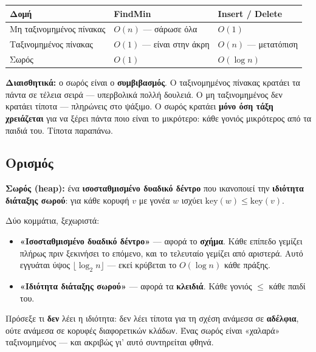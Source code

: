 \documentclass[11pt,a4paper]{article}
\begin{document}
\begin{center}
\begin{tabular}{@{}l l l@{}}
\toprule
Δομή & FindMin & Insert / Delete \\
\midrule
Μη ταξινομημένος πίνακας & $O(n)$ --- σάρωσε όλα      & $O(1)$ \\
Ταξινομημένος πίνακας    & $O(1)$ --- είναι στην άκρη & $O(n)$ --- μετατόπιση \\
Σωρός                    & $O(1)$                     & $O(\log n)$ \\
\bottomrule
\end{tabular}
\end{center}

\begin{intuition}
\textbf{Διαισθητικά:} ο σωρός είναι ο \textbf{συμβιβασμός}. Ο ταξινομημένος
πίνακας κρατάει τα πάντα σε τέλεια σειρά --- υπερβολικά πολλή δουλειά. Ο μη
ταξινομημένος δεν κρατάει τίποτα --- πληρώνεις στο ψάξιμο. Ο σωρός κρατάει
\textbf{μόνο όση τάξη χρειάζεται} για να ξέρει πάντα ποιο είναι το μικρότερο:
κάθε γονιός μικρότερος από τα παιδιά του. Τίποτα παραπάνω.
\end{intuition}

\subsection{Ορισμός}

\begin{keypoint}
\textbf{Σωρός (heap):} ένα \textbf{ισοσταθμισμένο δυαδικό δέντρο} που ικανοποιεί
την \textbf{ιδιότητα διάταξης σωρού}: για κάθε κορυφή $v$ με γονέα $w$ ισχύει
$\text{key}(w) \le \text{key}(v)$.
\end{keypoint}

Δύο κομμάτια, ξεχωριστά:
\begin{itemize}
  \item \textbf{«Ισοσταθμισμένο δυαδικό δέντρο»} --- αφορά το \textbf{σχήμα}.
  Κάθε επίπεδο γεμίζει πλήρως πριν ξεκινήσει το επόμενο, και το τελευταίο
  γεμίζει από αριστερά. Αυτό εγγυάται ύψος $\lfloor \log_2 n \rfloor$ --- εκεί
  κρύβεται το $O(\log n)$ κάθε πράξης.
  \item \textbf{«Ιδιότητα διάταξης σωρού»} --- αφορά τα \textbf{κλειδιά}. Κάθε
  γονιός $\le$ κάθε παιδί του.
\end{itemize}

Πρόσεξε τι \textbf{δεν} λέει η ιδιότητα: δεν λέει τίποτα για τη σχέση ανάμεσα σε
\textbf{αδέλφια}, ούτε ανάμεσα σε κορυφές διαφορετικών κλάδων. Ένας σωρός είναι
«χαλαρά» ταξινομημένος --- και ακριβώς γι' αυτό συντηρείται φθηνά.
\end{document}
